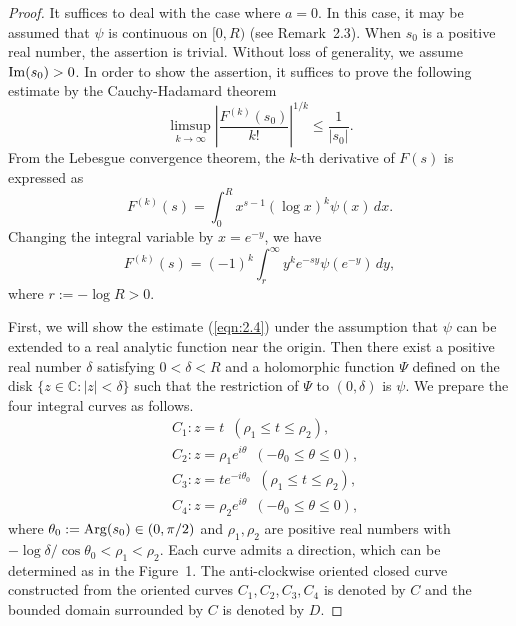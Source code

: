 \documentclass[12pt]{amsart}
\numberwithin{equation}{section}
\theoremstyle{definition}
\theoremstyle{remark}
\newcommand{\C}{{\mathbb C}}
\newcommand{\1}{{\bf 1}}
\begin{document}
\begin{proof}
It suffices to deal with 
the case where $a=0$.   
In this case, it may be assumed that 
$\psi$ is continuous on $[0,R)$ 
(see Remark~2.3). 
When $s_0$ is a positive real number, 
the assertion is trivial.
Without loss of generality, 
we assume ${\rm Im}(s_{0})>0$. 
In order to show the assertion, 
it suffices to prove the following estimate 
by the Cauchy-Hadamard theorem
\begin{equation}\label{eqn:2.4}
\limsup_{k \to \infty}
\left| \frac{F^{(k)}(s_0)}{k!} \right|^{1/k} 
\le \frac{1}{|s_0|}.
\end{equation}
From the Lebesgue convergence theorem,
the $k$-th derivative of $F(s)$ is expressed as
\begin{equation}\label{eqn:2.5}
F^{(k)}(s)
=\int_0^R x^{s-1}(\log x)^k\psi(x)\,dx.
\end{equation}
Changing the integral variable by $x=e^{-y}$,
we have 
\begin{equation}\label{eqn:2.6}
F^{(k)}(s)
=(-1)^k\int_r^{\infty} y^k e^{-sy}\psi(e^{-y})\,dy,
\end{equation}
where $r:=-\log R>0$.

First, we will show the estimate (\ref{eqn:2.4}) 
under the assumption that  
$\psi$ can be extended to a real analytic function 
near the origin.
Then there exist a positive real number $\delta$ 
satisfying $0<\delta<R$
and
a holomorphic function $\Psi$ defined on the disk 
$\{ z \in \C : |z|<\delta \}$
such that 
the restriction of $\Psi$ 
to $(0,\delta)$ is $\psi$.
We prepare the four integral curves as follows.
\begin{equation*}\label{eqn:}
\begin{split}
&C_1 : z=t \,\,\, 
(\rho_1 \le t \le \rho_2), \\
&C_2 : z=\rho_1 e^{i\theta} \,\,\, 
(-\theta_0 \le \theta \le 0), \\
&C_3 : z=te^{-i\theta_0} \,\,\, 
(\rho_1 \le t \le \rho_2), \\
&C_4 : z=\rho_2 e^{i\theta} \,\,\, 
(-\theta_0 \le \theta \le 0),  
\end{split}
\end{equation*}
where $\theta_0:={\rm Arg}(s_0) \in (0,\pi/2)$
and $\rho_1, \rho_2$ are positive real numbers with 
$-\log \delta/\cos \theta_0<\rho_1<\rho_2$.
Each curve admits a direction,
which can be determined as in the Figure~1.
The anti-clockwise oriented closed curve 
constructed from the oriented curves 
$C_1, C_2, C_3, C_4$ is denoted by $C$
and 
the bounded domain surrounded 
by $C$ is denoted by $D$.


\end{proof}
\end{document}
